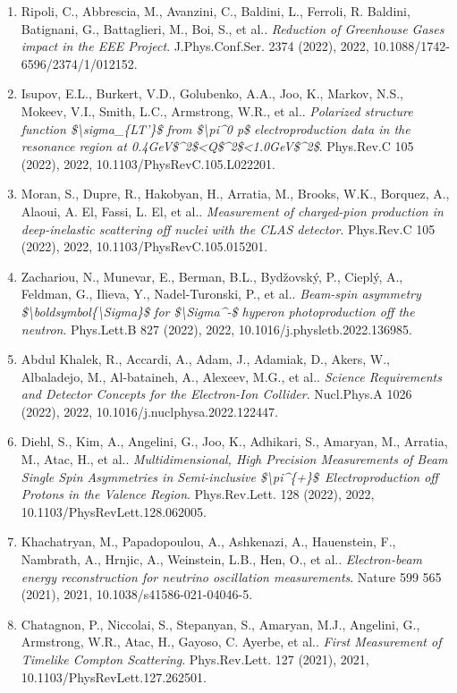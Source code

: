 \begin{enumerate}
\item Ripoli, C., Abbrescia, M., Avanzini, C., Baldini, L., Ferroli, R. Baldini, Batignani, G., Battaglieri, M., Boi, S., et al.. \textit{Reduction of Greenhouse Gases impact in the EEE Project}. J.Phys.Conf.Ser. 2374 (2022), 2022, 10.1088/1742-6596/2374/1/012152.
\item Isupov, E.L., Burkert, V.D., Golubenko, A.A., Joo, K., Markov, N.S., Mokeev, V.I., Smith, L.C., Armstrong, W.R., et al.. \textit{Polarized structure function \$\textbackslash{}sigma\_\{LT'\}\$ from \$\textbackslash{}pi\textasciicircum{}0 p\$ electroproduction data in the resonance region at 0.4GeV\$\textasciicircum{}2\$<Q\$\textasciicircum{}2\$<1.0GeV\$\textasciicircum{}2\$}. Phys.Rev.C 105 (2022), 2022, 10.1103/PhysRevC.105.L022201.
\item Moran, S., Dupre, R., Hakobyan, H., Arratia, M., Brooks, W.K., Borquez, A., Alaoui, A. El, Fassi, L. El, et al.. \textit{Measurement of charged-pion production in deep-inelastic scattering off nuclei with the CLAS detector}. Phys.Rev.C 105 (2022), 2022, 10.1103/PhysRevC.105.015201.
\item Zachariou, N., Munevar, E., Berman, B.L., Bydžovský, P., Cieplý, A., Feldman, G., Ilieva, Y., Nadel-Turonski, P., et al.. \textit{Beam-spin asymmetry \$\textbackslash{}boldsymbol\{\textbackslash{}Sigma\}\$ for \$\textbackslash{}Sigma\textasciicircum{}-\$ hyperon photoproduction off the neutron}. Phys.Lett.B 827 (2022), 2022, 10.1016/j.physletb.2022.136985.
\item Abdul Khalek, R., Accardi, A., Adam, J., Adamiak, D., Akers, W., Albaladejo, M., Al-bataineh, A., Alexeev, M.G., et al.. \textit{Science Requirements and Detector Concepts for the Electron-Ion Collider}. Nucl.Phys.A 1026 (2022), 2022, 10.1016/j.nuclphysa.2022.122447.
\item Diehl, S., Kim, A., Angelini, G., Joo, K., Adhikari, S., Amaryan, M., Arratia, M., Atac, H., et al.. \textit{Multidimensional, High Precision Measurements of Beam Single Spin Asymmetries in Semi-inclusive \$\textbackslash{}pi\textasciicircum{}\{+\}\$ Electroproduction off Protons in the Valence Region}. Phys.Rev.Lett. 128 (2022), 2022, 10.1103/PhysRevLett.128.062005.
\item Khachatryan, M., Papadopoulou, A., Ashkenazi, A., Hauenstein, F., Nambrath, A., Hrnjic, A., Weinstein, L.B., Hen, O., et al.. \textit{Electron-beam energy reconstruction for neutrino oscillation measurements}. Nature 599 565 (2021), 2021, 10.1038/s41586-021-04046-5.
\item Chatagnon, P., Niccolai, S., Stepanyan, S., Amaryan, M.J., Angelini, G., Armstrong, W.R., Atac, H., Gayoso, C. Ayerbe, et al.. \textit{First Measurement of Timelike Compton Scattering}. Phys.Rev.Lett. 127 (2021), 2021, 10.1103/PhysRevLett.127.262501.

\end{enumerate}
